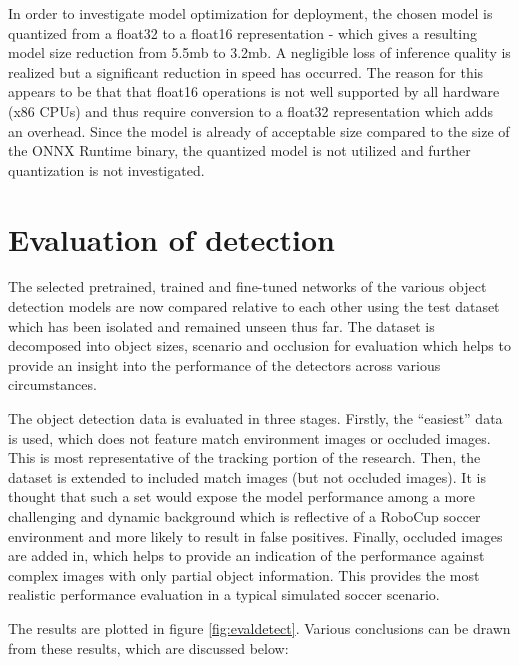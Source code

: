 \documentclass[a4paper,twoside,12pt]{report}
\begin{document}

In order to investigate model optimization for deployment, the chosen model is quantized from a float32 to a float16 representation - which gives a resulting model size reduction from 5.5mb to 3.2mb. A negligible loss of inference quality is realized but a significant reduction in speed has occurred. The reason for this appears to be that that float16 operations is not well supported by all hardware (x86 CPUs) and thus require conversion to a float32 representation which adds an overhead. Since the model is already of acceptable size compared to the size of the ONNX Runtime binary, the quantized model is not utilized and further quantization is not investigated.

\section{Evaluation of detection}

The selected pretrained, trained and fine-tuned networks of the various object detection models are now compared relative to each other using the test dataset which has been isolated and remained unseen thus far. The dataset is decomposed into object sizes, scenario and occlusion for evaluation which helps to provide an insight into the performance of the detectors across various circumstances. 

The object detection data is evaluated in three stages. Firstly, the ``easiest'' data is used, which does not feature match environment images or occluded images. This is most representative of the tracking portion of the research. Then, the dataset is extended to included match images (but not occluded images). It is thought that such a set would expose the model performance among a more challenging and dynamic background which is reflective of a RoboCup soccer environment and more likely to result in false positives. Finally, occluded images are added in, which helps to provide an indication of the performance against complex images with only partial object information. This provides the most realistic performance evaluation in a typical simulated soccer scenario. 

The results are plotted in figure \ref{fig:evaldetect}. Various conclusions can be drawn from these results, which are discussed below:
\end{document}
